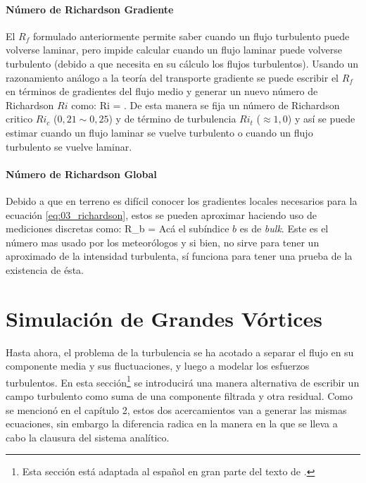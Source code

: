 \paragraph{Número de Richardson Gradiente} El $R_f$ formulado anteriormente permite saber cuando un flujo turbulento puede volverse laminar, pero impide calcular cuando un flujo laminar puede volverse turbulento (debido a que necesita en su cálculo los flujos turbulentos). Usando un razonamiento análogo a la teoría del transporte gradiente se puede escribir el $R_f$ en términos de gradientes del flujo medio y generar un nuevo número de Richardson $Ri$ como: 
\be\label{eq:03_richardson} Ri = . \ee
De esta manera se fija un número de Richardson critico $Ri_c$ ($0,21\sim0,25$) y de término de turbulencia $Ri_t$ ($\approx1,0$) y así se puede estimar cuando un flujo laminar se vuelve turbulento o cuando un flujo turbulento se vuelve laminar.
\paragraph{Número de Richardson Global} Debido a que en terreno es difícil conocer los gradientes locales necesarios para la ecuación \ref{eq:03_richardson}, estos se pueden aproximar haciendo uso de mediciones discretas como:
\be R_b =  \ee
Acá el subíndice $b$ es de \emph{bulk}. Este es el número mas usado por los meteorólogos y si bien, no sirve para tener un aproximado de la intensidad turbulenta, sí funciona para tener una prueba de la existencia de ésta.
\newpage






\section{Simulación de Grandes Vórtices}
Hasta ahora, el problema de la turbulencia se ha acotado a separar el flujo en su componente media y sus fluctuaciones, y luego a modelar los esfuerzos turbulentos. En esta sección\footnote{Esta sección está adaptada al español en gran parte del texto de \cite{pope2000turbulent}.} se introducirá una manera alternativa de escribir un campo turbulento como suma de una componente filtrada y otra residual. Como se mencionó en el capítulo 2, estos dos acercamientos van a generar las mismas ecuaciones, sin embargo la diferencia radica en la manera en la que se lleva a cabo la clausura del sistema analítico.

